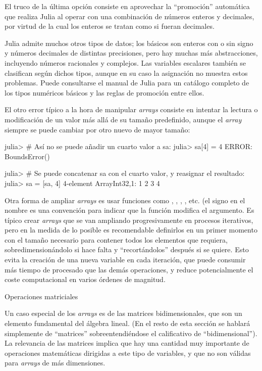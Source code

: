 ﻿\documentclass[spanish]{article}
\begin{document}
El truco de la última opción consiste en aprovechar la ``promoción''
automática que realiza Julia al operar con una combinación de números
enteros y decimales, por virtud de la cual los enteros se tratan como
si fueran decimales.

Julia admite muchos otros tipos de datos; los básicos son enteros
con o sin signo y números decimales de distintas precisiones, pero
hay muchas más abstracciones, incluyendo números racionales y complejos.
Las variables escalares también se clasifican según dichos tipos,
aunque en su caso la asignación no muestra estos problemas. Puede
consultarse el manual de Julia para un catálogo completo de los tipos
numéricos básicos y las reglas de promoción entre ellos.

El otro error típico a la hora de manipular \emph{arrays} consiste
en intentar la lectura o modificación de un valor más allá de su tamaño
predefinido, aunque el \emph{array} siempre se puede cambiar por otro
nuevo de mayor tamaño:

julia> # Así no se puede añadir un cuarto valor a sa:
julia> sa[4] = 4
ERROR: BoundsError()

julia> # Se puede concatenar sa con el cuarto valor, y reasignar el resultado:
julia> sa = [sa, 4]
4-element Array{Int32,1}:
 1 2 3 4

Otra forma de ampliar \emph{arrays} es usar funciones como ,
, , , etc. (el signo
\code{!} en el nombre es una convención para indicar que la función
modifica el argumento. Es típico crear \emph{arrays} que se van ampliando
progresivamente en procesos iterativos, pero en la medida de lo posible
es recomendable definirlos en un primer momento con el tamaño necesario
para contener todos los elementos que requiera, sobredimensionándolo
si hace falta y ``recortándolos'' después si se quiere. Esto evita
la creación de una nueva variable en cada iteración, que puede consumir
más tiempo de procesado que las demás operaciones, y reduce potencialmente
el coste computacional en varios órdenes de magnitud.

Operaciones matriciales

Un caso especial de los \emph{arrays} es de las matrices bidimensionales,
que son un elemento fundamental del álgebra lineal. (En el resto de
esta sección se hablará simplemente de ``matrices'' sobreentendiéndose
el calificativo de ``bidimensional''). La relevancia de las matrices
implica que hay una cantidad muy importante de operaciones matemáticas
dirigidas a este tipo de variables, y que no son válidas para \emph{arrays}
de más dimensiones.
\end{document}
